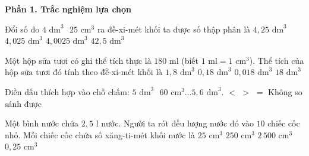 \textbf{Phần 1. Trắc nghiệm lựa chọn}

\begin{ex} %
Đổi số đo $4\text{ dm}^3\text{ }25\text{ cm}^3$ ra đề-xi-mét khối ta được số thập phân là
\choice
{$4{,}25\text{ dm}^3$}
{\True $4{,}025\text{ dm}^3$}
{$4{,}0025\text{ dm}^3$}
{$42{,}5\text{ dm}^3$}
\end{ex}

\begin{ex} %
Một hộp sữa tươi có ghi thể tích thực là $180\text{ ml}$ (biết $1\text{ ml} = 1\text{ cm}^3$). Thể tích của hộp sữa tươi đó tính theo đề-xi-mét khối là
\choice
{$1{,}8\text{ dm}^3$}
{\True $0{,}18\text{ dm}^3$}
{$0{,}018\text{ dm}^3$}
{$18\text{ dm}^3$}
\end{ex}

\begin{ex} %
Điền dấu thích hợp vào chỗ chấm: $5\text{ dm}^3\text{ }60\text{ cm}^3 \dots 5{,}6\text{ dm}^3$.
\choice
{\True $<$}
{$>$}
{$=$}
{Không so sánh được}
\end{ex}

\begin{ex} %
Một bình nước chứa $2{,}5\text{ l}$ nước. Người ta rót đều lượng nước đó vào $10$ chiếc cốc nhỏ. Mỗi chiếc cốc chứa số xăng-ti-mét khối nước là
\choice
{$25\text{ cm}^3$}
{\True $250\text{ cm}^3$}
{$2\,500\text{ cm}^3$}
{$0{,}25\text{ cm}^3$}
\end{ex}

